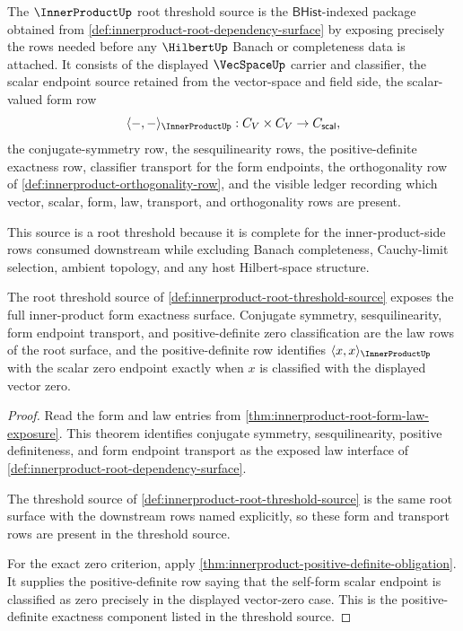 \begin{definition}
\label{def:innerproduct-root-threshold-source}
The $\InnerProductUp$ root threshold source is the
$\mathsf{BHist}$-indexed package obtained from
\autoref{def:innerproduct-root-dependency-surface} by exposing precisely the
rows needed before any $\HilbertUp$ Banach or completeness data is attached.
It consists of the displayed $\VecSpaceUp$ carrier and classifier, the scalar
endpoint source retained from the vector-space and field side, the
scalar-valued form row
$$
\langle-,-\rangle_{\InnerProductUp}:C_V\times C_V\to C_{\mathsf{scal}},
$$
the conjugate-symmetry row, the sesquilinearity rows, the
positive-definite exactness row, classifier transport for the form endpoints,
the orthogonality row of \autoref{def:innerproduct-orthogonality-row}, and the
visible ledger recording which vector, scalar, form, law, transport, and
orthogonality rows are present.

This source is a root threshold because it is complete for the
inner-product-side rows consumed downstream while excluding Banach
completeness, Cauchy-limit selection, ambient topology, and any host
Hilbert-space structure.
\end{definition}

\begin{theorem}
\label{thm:innerproduct-root-threshold-form-exactness}
The root threshold source of
\autoref{def:innerproduct-root-threshold-source} exposes the full
inner-product form exactness surface. Conjugate symmetry, sesquilinearity,
form endpoint transport, and positive-definite zero classification are the
law rows of the root surface, and the positive-definite row identifies
$\langle x,x\rangle_{\InnerProductUp}$ with the scalar zero endpoint exactly
when $x$ is classified with the displayed vector zero.
\end{theorem}
\begin{proof}
Read the form and law entries from
\autoref{thm:innerproduct-root-form-law-exposure}. This theorem identifies
conjugate symmetry, sesquilinearity, positive definiteness, and form endpoint
transport as the exposed law interface of
\autoref{def:innerproduct-root-dependency-surface}.

The threshold source of \autoref{def:innerproduct-root-threshold-source} is
the same root surface with the downstream rows named explicitly, so these
form and transport rows are present in the threshold source.

For the exact zero criterion, apply
\autoref{thm:innerproduct-positive-definite-obligation}. It supplies the
positive-definite row saying that the self-form scalar endpoint is classified
as zero precisely in the displayed vector-zero case. This is the
positive-definite exactness component listed in the threshold source.
\end{proof}

